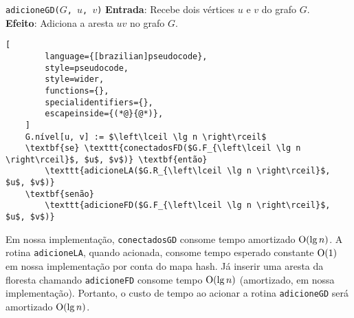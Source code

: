 \begin{programruledcaption}{\texttt{adicioneGD($G$, $u$, $v$)} \label{prog:addGD}}
    \noindent\textbf{Entrada}: Recebe dois vértices $u$ e $v$ do grafo $G$. \\
    \textbf{Efeito}: Adiciona a aresta $uv$ no grafo $G$.
    \vspace{-0.5\baselineskip}
    \begin{lstlisting}[
        language={[brazilian]pseudocode},
        style=pseudocode,
        style=wider,
        functions={},
        specialidentifiers={},
        escapeinside={(*@}{@*)},
    ]
    G.nível[u, v] := $\left\lceil \lg n \right\rceil$
    \textbf{se} \texttt{conectadosFD($G.F_{\left\lceil \lg n \right\rceil}$, $u$, $v$)} \textbf{então}
        \texttt{adicioneLA($G.R_{\left\lceil \lg n \right\rceil}$, $u$, $v$)}
    \textbf{senão}
        \texttt{adicioneFD($G.F_{\left\lceil \lg n \right\rceil}$, $u$, $v$)}
    \end{lstlisting}
    \vspace{-0.5\baselineskip}
\end{programruledcaption}

\raggedbottom


Em nossa implementação, \texttt{conectadosGD} consome tempo amortizado $\mathrm{O}(\lg n)$. A rotina \texttt{adicioneLA}, quando acionada, consome tempo esperado constante $\mathrm{O}(1)$ em nossa implementação por conta do mapa hash. Já inserir uma aresta da floresta chamando \texttt{adicioneFD} consome tempo $\mathrm{O}(\lg n)$ (amortizado, em nossa implementação). Portanto, o custo de tempo ao acionar a rotina \texttt{adicioneGD} será amortizado $\mathrm{O}(\lg n)$.

